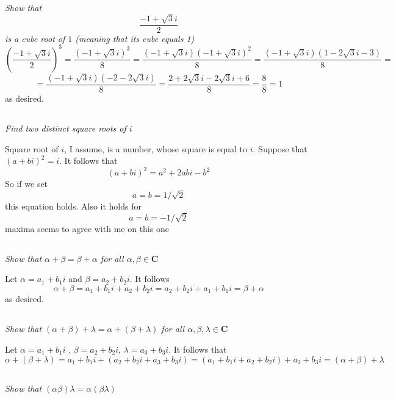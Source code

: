 \documentclass[11pt,oneside,titlepage]{book}
\begin{document}
\subsection{}
\textit{Show that }
$$\frac{-1  + \sqrt{3}i}{2}$$
\textit{is a cube root of $1$ (meaning that its cube equals 1)}
$$(\frac{-1  + \sqrt{3}i}{2})^3 =
\frac{(-1  + \sqrt{3}i)^3}{8} =
\frac{(-1  + \sqrt{3}i)(-1  + \sqrt{3}i)^2}{8} =
\frac{(-1  + \sqrt{3}i)(1  - 2\sqrt{3}i - 3)}{8} =
$$
$$
=\frac{(-1  + \sqrt{3}i)(-2  - 2\sqrt{3}i)}{8} =
\frac{2 + 2\sqrt{3}i - 2\sqrt{3}i + 6}{8} =
\frac{8}{8} = 1
$$
as desired.

\subsection{}
\textit{Find two distinct square roots of $i$}

Square root of $i$, I assume, is a number, whose square is equal to $i$.
Suppose that $(a + bi)^2 = i$. It follows that
$$(a + bi)^2 = a^2 + 2abi - b^2$$
So if we set $$a = b = 1/\sqrt{2}$$ this equation holds. Also it holds for
$$a = b = -1/\sqrt{2}$$
maxima seems to agree with me on this one

\subsection{}
\textit{Show that $\alpha + \beta = \beta + \alpha$ for all
  $\alpha, \beta \in \textbf{C}$}

Let $\alpha = a_1 + b_1 i$ and $\beta = a_2 + b_2 i$. It follows
$$\alpha + \beta = a_1 + b_1 i + a_2 + b_2 i = a_2 + b_2 i + a_1 + b_1 i =
\beta  + \alpha$$
as desired.

\subsection{}
\textit{Show that $(\alpha + \beta) + \lambda = \alpha + (\beta + \lambda)$
  for all  $\alpha, \beta, \lambda \in \textbf{C}$}

Let $\alpha = a_1 + b_1 i$ , $\beta = a_2 + b_2 i$, $\lambda = a_3 + b_3 i$.
It follows that 
$$\alpha + (\beta + \lambda)  = a_1 + b_1 i + (a_2 + b_2 i + a_3 + b_3 i) =
(a_1 + b_1 i + a_2 + b_2 i) + a_3 + b_3 i = 
(\alpha + \beta) + \lambda$$

\subsection{}
\textit{Show that $(\alpha \beta) \lambda = \alpha( \beta \lambda)$}
\end{document}
